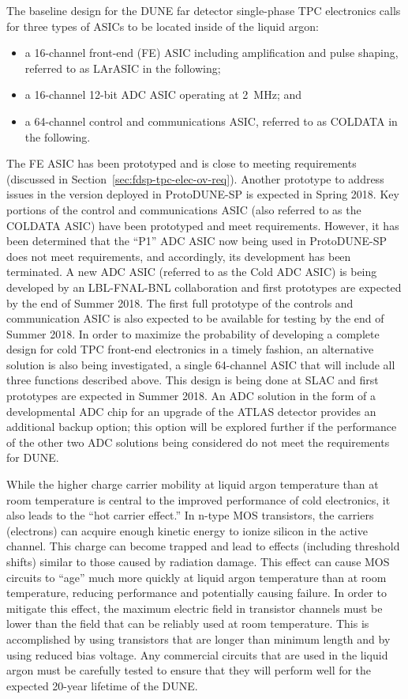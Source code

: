 The baseline design for the DUNE far detector single-phase TPC electronics calls for three types of ASICs to be located inside of the liquid argon:
\begin{itemize}
\item{a 16-channel front-end (FE) ASIC including amplification and pulse shaping, referred to as LArASIC in the following;}
\item{a 16-channel 12-bit ADC ASIC operating at 2~MHz; and}
\item{a 64-channel control and communications ASIC, referred to as COLDATA in the following.}
\end{itemize}
The FE ASIC has been prototyped and is close to meeting requirements (discussed in Section~\ref{sec:fdsp-tpc-elec-ov-req}). Another prototype to address issues in the version deployed in ProtoDUNE-SP is expected in Spring 2018. Key portions of the control and communications ASIC (also referred to as the COLDATA ASIC) have been prototyped and meet requirements.  However, it has been determined that the ``P1'' ADC ASIC now being used in ProtoDUNE-SP does not meet requirements, and accordingly, its development has been terminated.  A new ADC ASIC (referred to as the Cold ADC ASIC) is being developed by an LBL-FNAL-BNL collaboration and first prototypes are expected by the end of Summer 2018.  The first full prototype of the controls and communication ASIC is also expected to be available for testing by the end of Summer 2018.  In order to maximize the probability of developing a complete design for cold TPC front-end electronics in a timely fashion, an alternative solution is also being investigated, a single 64-channel ASIC that will include all three functions described above.  This design is being done at SLAC and first prototypes are expected in Summer 2018.  An ADC solution in the form of a developmental ADC chip for an upgrade of the ATLAS detector provides an additional backup option; this option will be explored further if the performance of the other two ADC solutions being considered do not meet the requirements for DUNE.

While the higher charge carrier mobility at liquid argon temperature than at room temperature is central to the improved performance of cold electronics, it also leads to the ``hot carrier effect.''  In n-type MOS transistors, the carriers (electrons) can acquire enough kinetic energy to ionize silicon in the active channel.  This charge can become trapped and lead to effects (including threshold shifts) similar to those caused by radiation damage.  This effect can cause MOS circuits to ``age'' much more quickly at liquid argon temperature than at room temperature, reducing performance and potentially causing failure.  In order to mitigate this effect, the maximum electric field in transistor channels must be lower than the field that can be reliably used at room temperature.  This is accomplished by using transistors that are longer than minimum length and by using reduced bias voltage.  Any commercial circuits that are used in the liquid argon must be carefully tested to ensure that they will perform well for the expected 20-year lifetime of the DUNE.


